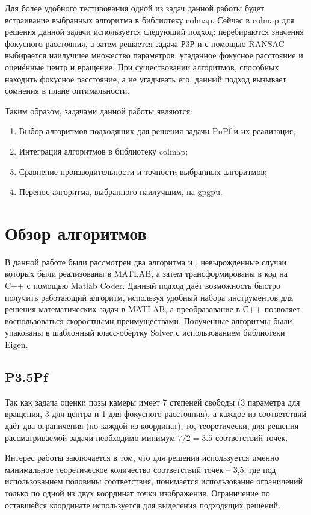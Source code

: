 \documentclass[%
bachelor,    %
natbib,      %
subf,        %
href,        %
colorlinks,  %
]{disser}
\begin{document}
Для более удобного тестирования одной из задач данной работы будет встраивание выбранных алгоритма в библиотеку colmap.
Сейчас в colmap для решения данной задачи используется следующий подход: перебираются значения фокусного расстояния, а затем решается задача Р3Р и с помощью RANSAC выбирается наилучшее множество параметров: угаданное фокусное расстояние и оценённые центр и вращение.
При существовании алгоритмов, способных находить фокусное расстояние, а не угадывать его, данный подход вызывает сомнения в плане оптимальности.

Таким образом, задачами данной работы являются:
\begin{enumerate}
    \item Выбор алгоритмов подходящих для решения задачи PnPf и их реализация;
    \item Интеграция алгоритмов в библиотеку colmap;
    \item Сравнение производительности и точности выбранных алгоритмов;
    \item Перенос алгоритма, выбранного наилучшим, на gpgpu.
\end{enumerate}

\clearpage\section{Обзор алгоритмов}

В данной работе были рассмотрен два алгоритма \cite{p35p} и \cite{p4p}, невырожденные случаи которых были реализованы в MATLAB, а затем трансформированы в код на C++ с помощью Matlab Coder. Данный подход даёт возможность быстро получить работающий алгоритм, используя удобный набора инструментов для решения математических задач в MATLAB, а преобразование в С++ позволяет воспользоваться скоростными преимуществами.
Полученные алгоритмы были упакованы в шаблонный класс-обёртку Solver с использованием библиотеки Eigen.
\subsection{P3.5Pf}
    Так как задача оценки позы камеры имеет 7 степеней свободы (3 параметра для вращения, 3 для центра и 1 для фокусного расстояния), а каждое из соответствий даёт два ограничения (по каждой из координат), то, теоретически, для решения рассматриваемой задачи необходимо минимум $7/2=3.5$ соответствий точек.

    Интерес работы \cite{p35p} заключается в том, что для решения используется именно минимальное теоретическое количество соответствий точек -- 3,5, где под использованием половины соответствия, понимается использование ограничений только по одной из двух координат точки изображения. 
    Ограничение по оставшейся координате используется для выделения подходящих решений.
    
\end{document}
